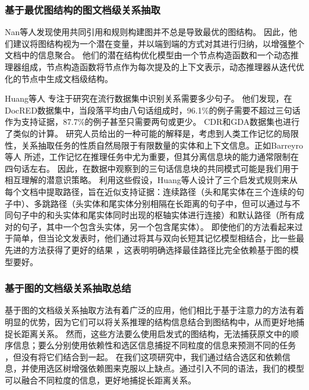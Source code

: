 \documentclass[bachelor]{thesis-uestc}
\begin{document}
\subsubsection{基于最优图结构的图文档级关系抽取}\label{subsec:optimal-graph}

Nan等人\cite{nan-etal-2020-reasoning}发现使用共同引用和规则构建图并不总是导致最优的图结构。
因此，他们建议将图结构视为一个潜在变量，并以端到端的方式对其进行归纳，以增强整个文档中的信息聚合。
他们的潜在结构优化模型由一个节点构造函数和一个动态推理器组成，节点构造函数将节点作为每次提及的上下文表示，动态推理器从迭代优化的节点中生成文档级结构。\par

Huang等人 \cite{huang-etal-2021-three}专注于研究在流行数据集中识别关系需要多少句子。
他们发现，在DocRED数据集中，当段落平均由八句话组成时，96.1\%的例子需要不超过三句话作为支持证据，87.7\%的例子甚至只需要两句或更少。
CDR和GDA数据集也进行了类似的计算。
研究人员给出的一种可能的解释是，考虑到人类工作记忆的局限性，关系抽取任务的性质自然局限于有限数量的实体和上下文信息。正如Barreyro等人 \cite{barreyro2012working} 所述，工作记忆在推理任务中尤为重要，但其分离信息块的能力通常限制在四句话左右。
因此，在数据中观察到的三句话信息块的共同模式可能是我们用于相互理解的潜意识策略。
利用这些假设，Huang等人设计了三个启发式规则来从每个文档中提取路径，旨在近似支持证据：连续路径（头和尾实体在三个连续的句子中）、多跳路径（头实体和尾实体分别相隔在长距离的句子中，但可以通过与不同句子中的和头实体和尾实体同时出现的枢轴实体进行连接）和默认路径（所有成对的句子，其中一个包含头实体，另一个包含尾实体）。
即使他们的方法看起来过于简单，但当论文发表时，他们通过将其与双向长短其记忆模型相结合，比一些最先进的方法获得了更好的结果 \cite{nan-etal-2020-reasoning,GAIN}，这表明明确选择最佳路径比完全依赖基于图的模型要好。\par

\subsubsection{基于图的文档级关系抽取总结}\label{subsec:graph-neural-network}

基于图的文档级关系抽取方法有着广泛的应用，他们相比于基于注意力的方法有着明显的优势，因为它们可以将关系推理的结构信息结合到图结构中，从而更好地捕捉长距离关系。
然而，这些方法要么使用启发式的图结构，无法捕获原文中的顺序信息\cite{GAIN, Xu2020DocumentLevelRE}；要么分别使用依赖性和选区信息捕捉不同粒度的信息来预测不同的任务 \cite{SagDRE, duan-etal-2022-just}，但没有将它们结合到一起。
在我们这项研究中，我们通过结合选区和依赖信息，并使用选区树增强依赖图来克服以上缺点。通过引入不同的语法，我们的模型可以融合不同粒度的信息，更好地捕捉长距离关系。
\end{document}
